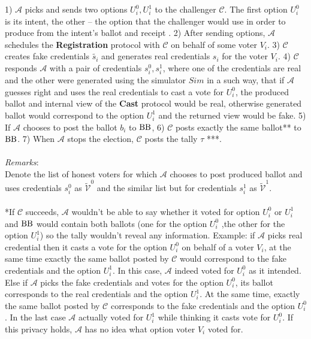  1)  $\mathcal{A}$ picks and sends two options $U_i^0,U_i^1$ to the challenger $\mathcal{C}$. The first option $U_i^0$ is its intent, the other -- the option that the challenger would use in order to produce  from the intent's ballot and receipt . 2) After sending options, $\mathcal{A}$ schedules the   \textbf{Registration} protocol with $\mathcal{C}$ on behalf of some voter $V_i$. 3) $\mathcal{C}$ creates fake credentials $\tilde{s_i}$ and generates real credentials $s_i$ for the voter $V_i$. 4) $\mathcal{C}$ responds $\mathcal{A}$ with a pair of credentials $s_i^0,s_i^1$, where one of the credentials are real and the other were generated using the simulator $Sim$ in a such way, that if $\mathcal{A}$ guesses right and uses the real credentials to cast a vote for $U_i^0$, the produced ballot and internal view of the \textbf{Cast} protocol would be real, otherwise generated ballot would correspond to the option $U_i^1$ and the returned view would be fake. 5) If $\mathcal{A}$ chooses to post the ballot $b_i$ to $\operatorname{BB}$, 6) $\mathcal{C}$  posts exactly the same ballot** to $\operatorname{BB}$. 7) When $\mathcal{A}$ stops the election, $\mathcal{C}$ posts the tally $\tau$ ***. \\\\
\textit{Remarks}:\\
Denote the list of honest voters for which $\mathcal{A}$ chooses to post produced ballot and uses credentials $s_i^0$  as $ \tilde{\mathcal{V}}^0$ and the similar list but for credentials $s_i^1$ as $ \tilde{\mathcal{V}}^1$. \\\\
*If  $\mathcal{C}$ succeeds, $\mathcal{A}$ wouldn't be able to say whether it voted for option $U_i^0$ or $U_i^1$ and $\operatorname{BB}$ would contain both ballots (one for the option $U_i^0$ ,the other for the option $U_i^1$) so the tally wouldn't reveal any information. Example: if $\mathcal{A}$  picks real credential then it casts a vote for the option  $U_i^0$ on behalf of a voter $V_i$, at the same time exactly the same ballot posted by $\mathcal{C}$ would correspond to the fake credentials and the option $U_i^1$. In this case, $\mathcal{A}$ indeed voted for $U_i^0$ as it intended. Else if $\mathcal{A}$ picks the fake credentials and votes for the option $U_i^0$,  its ballot corresponds to the real credentials and  the option $U_i^1$. At the same time, exactly the same ballot posted by $\mathcal{C}$ corresponds to the fake credentials  and the option $U_i^0$. In the last case $\mathcal{A}$ actually voted for $U_i^1$ while thinking it casts vote for $U_i^0$. If this privacy holds,  $\mathcal{A}$ has no idea what option voter $V_i$ voted for. \\\\
